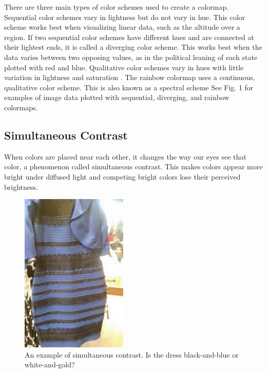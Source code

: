 \documentclass[journal,12pt]{IEEEtran}
\begin{document}
There are three main types of color schemes used to create a colormap.
Sequential color schemes vary in lightness but do not
vary in hue. This color scheme works best when visualizing linear data, such as the altitude over a region.
If two sequential color schemes have different hues and are
connected at their lightest ends, it is called a diverging color scheme. This works best when
the data varies between two opposing values, as in the political leaning of each state plotted 
with red and blue. Qualitative color
schemes vary in hues with little variation in lightness
and saturation \cite{colormapping}. The rainbow colormap uses a continuous,
qualitative color scheme. This is also known as a spectral scheme \cite{spectralschemes}
See Fig. 1 for examples of image data plotted with 
sequential, diverging, and rainbow colormaps.

\subsection{Simultaneous Contrast}

When colors are placed near each other, it changes the way our eyes see that color,
a phenomenon called simultaneous contrast.
This makes colors appear more bright under diffused light
and competing bright colors lose their perceived brightness.

\begin{figure}
\centering
\includegraphics[width=2in]{colordress.png}%
\caption{An example of simultaneous contrast. Is the dress black-and-blue or white-and-gold?}
\end{figure}
\end{document}
